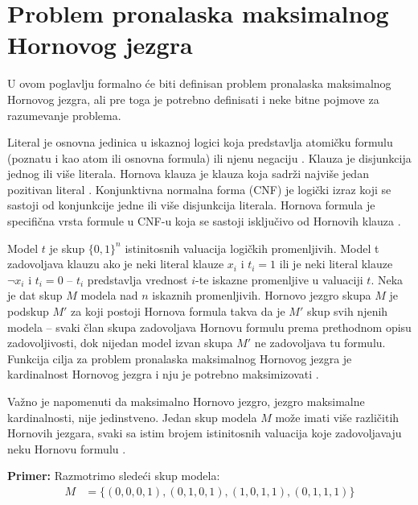 \documentclass[12pt,oneside]{memoir}
\begin{document}
\newpage



\section{Problem pronalaska maksimalnog Hornovog jezgra}
U ovom poglavlju formalno će biti definisan problem pronalaska maksimalnog Hornovog jezgra, ali pre toga je potrebno definisati i neke bitne pojmove za razumevanje problema.

Literal je osnovna jedinica u iskaznoj logici koja predstavlja atomičku formulu (poznatu i kao atom ili osnovna formula) ili njenu negaciju \cite{doc_lit}. Klauza je disjunkcija jednog ili više literala. Hornova klauza je klauza koja sadrži najviše jedan pozitivan literal \cite{doc_horn_clause}. Konjunktivna normalna forma (CNF) je logički izraz koji se sastoji od konjunkcije jedne ili više disjunkcija literala. Hornova formula je specifična vrsta formule u CNF-u koja se sastoji isključivo od Hornovih klauza \cite{doc3}.


Model $t$ je skup $\{0, 1\}^n$ istinitosnih valuacija logičkih promenljivih. Model t zadovoljava klauzu ako je neki literal klauze $x_i$ i $t_i=1$ ili je neki literal klauze $\neg x_i$ i $t_i=0$ -- $t_i$ predstavlja vrednost $i$-te iskazne promenljive u valuaciji $t$. Neka je dat skup $M$ modela nad $n$ iskaznih promenljivih. Hornovo jezgro skupa $M$ je podskup $M'$ za koji postoji Hornova formula takva da je $M'$ skup svih njenih modela -- svaki član skupa zadovoljava Hornovu formulu prema prethodnom opisu zadovoljivosti, dok nijedan model izvan skupa $M'$ ne zadovoljava tu formulu. Funkcija cilja za problem pronalaska maksimalnog Hornovog jezgra je kardinalnost Hornovog jezgra i nju je potrebno maksimizovati \cite{doc3,HCproblem}.

Važno je napomenuti da maksimalno Hornovo jezgro, jezgro maksimalne kardinalnosti, nije jedinstveno. Jedan skup modela $M$ može imati više različitih Hornovih jezgara, svaki sa istim brojem istinitosnih valuacija koje zadovoljavaju neku Hornovu formulu \cite{doc3}.

\textbf{Primer:} Razmotrimo sledeći skup modela:
\begin{align*}
M &= \{ (0, 0, 0, 1), (0, 1, 0, 1), (1, 0, 1, 1), (0, 1, 1, 1) \}
\end{align*}
\end{document}
